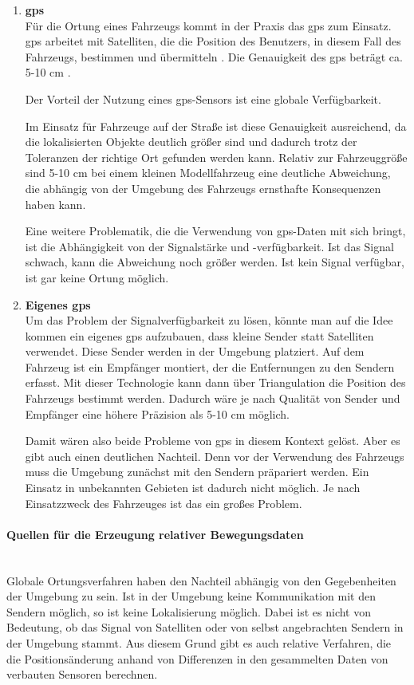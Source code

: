 \begin{enumerate}[leftmargin=*]
    \item \textbf{\acf{gps}} \\
    Für die Ortung eines Fahrzeugs kommt in der Praxis das \ac{gps} zum Einsatz. 
    \ac{gps} arbeitet mit Satelliten, die die Position des Benutzers, in diesem Fall des Fahrzeugs, bestimmen und übermitteln \cite{ashby2003relativity}. 
    Die Genauigkeit des \ac{gps} beträgt ca. 5-10 cm \cite{ashby2003relativity}.

    Der Vorteil der Nutzung eines \ac{gps}-Sensors ist eine globale Verfügbarkeit.

    Im Einsatz für Fahrzeuge auf der Straße ist diese Genauigkeit ausreichend, 
    da die lokalisierten Objekte deutlich größer sind und dadurch trotz der Toleranzen der richtige Ort gefunden werden kann.
    Relativ zur Fahrzeuggröße sind 5-10 cm bei einem kleinen Modellfahrzeug eine deutliche Abweichung, die abhängig von der Umgebung des Fahrzeugs ernsthafte Konsequenzen haben kann.

    Eine weitere Problematik, die die Verwendung von \ac{gps}-Daten mit sich bringt, ist die Abhängigkeit von der Signalstärke und -verfügbarkeit. 
    Ist das Signal schwach, kann die Abweichung noch größer werden. 
    Ist kein Signal verfügbar, ist gar keine Ortung möglich.
    
    \item \textbf{Eigenes \ac{gps}} \\
    Um das Problem der Signalverfügbarkeit zu lösen, könnte man auf die Idee kommen ein eigenes \acf{gps} aufzubauen, dass kleine Sender statt Satelliten verwendet.
    Diese Sender werden in der Umgebung platziert. 
    Auf dem Fahrzeug ist ein Empfänger montiert, der die Entfernungen zu den Sendern erfasst.
    Mit dieser Technologie kann dann über Triangulation die Position des Fahrzeugs bestimmt werden. 
    Dadurch wäre je nach Qualität von Sender und Empfänger eine höhere Präzision als 5-10 cm möglich. 
    
    Damit wären also beide Probleme von \ac{gps} in diesem Kontext gelöst. 
    Aber es gibt auch einen deutlichen Nachteil. 
    Denn vor der Verwendung des Fahrzeugs muss die Umgebung zunächst mit den Sendern präpariert werden. 
    Ein Einsatz in unbekannten Gebieten ist dadurch nicht möglich. 
    Je nach Einsatzzweck des Fahrzeuges ist das ein großes Problem.
\end{enumerate}

\paragraph{Quellen für die Erzeugung relativer Bewegungsdaten} \mbox{}\\
Globale Ortungsverfahren haben den Nachteil abhängig von den Gegebenheiten der Umgebung zu sein.
Ist in der Umgebung keine Kommunikation mit den Sendern möglich, so ist keine Lokalisierung möglich.
Dabei ist es nicht von Bedeutung, ob das Signal von Satelliten oder von selbst angebrachten Sendern in der Umgebung stammt.
Aus diesem Grund gibt es auch relative Verfahren, die die Positionsänderung anhand von Differenzen in den gesammelten Daten von verbauten Sensoren berechnen.


